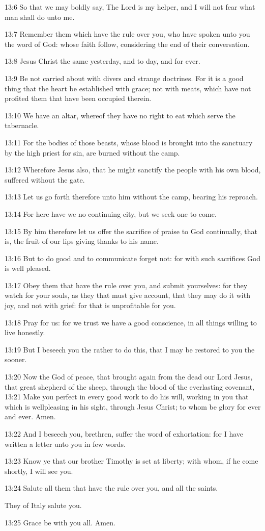 13:6 So that we may boldly say, The Lord is my helper, and I will not
fear what man shall do unto me.

13:7 Remember them which have the rule over you, who have spoken unto
you the word of God: whose faith follow, considering the end of their
conversation.

13:8 Jesus Christ the same yesterday, and to day, and for ever.

13:9 Be not carried about with divers and strange doctrines. For it is
a good thing that the heart be established with grace; not with meats,
which have not profited them that have been occupied therein.

13:10 We have an altar, whereof they have no right to eat which serve
the tabernacle.

13:11 For the bodies of those beasts, whose blood is brought into the
sanctuary by the high priest for sin, are burned without the camp.

13:12 Wherefore Jesus also, that he might sanctify the people with his
own blood, suffered without the gate.

13:13 Let us go forth therefore unto him without the camp, bearing his
reproach.

13:14 For here have we no continuing city, but we seek one to come.

13:15 By him therefore let us offer the sacrifice of praise to God
continually, that is, the fruit of our lips giving thanks to his name.

13:16 But to do good and to communicate forget not: for with such
sacrifices God is well pleased.

13:17 Obey them that have the rule over you, and submit yourselves:
for they watch for your souls, as they that must give account, that
they may do it with joy, and not with grief: for that is unprofitable
for you.

13:18 Pray for us: for we trust we have a good conscience, in all
things willing to live honestly.

13:19 But I beseech you the rather to do this, that I may be restored
to you the sooner.

13:20 Now the God of peace, that brought again from the dead our Lord
Jesus, that great shepherd of the sheep, through the blood of the
everlasting covenant, 13:21 Make you perfect in every good work to do
his will, working in you that which is wellpleasing in his sight,
through Jesus Christ; to whom be glory for ever and ever. Amen.

13:22 And I beseech you, brethren, suffer the word of exhortation: for
I have written a letter unto you in few words.

13:23 Know ye that our brother Timothy is set at liberty; with whom,
if he come shortly, I will see you.

13:24 Salute all them that have the rule over you, and all the saints.

They of Italy salute you.

13:25 Grace be with you all. Amen.

